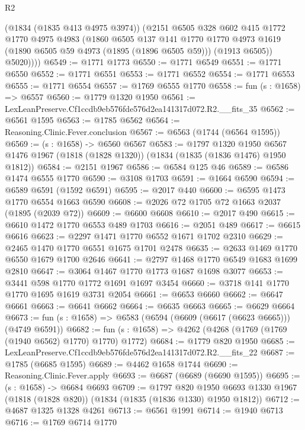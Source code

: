 \begin{lexlean}{R2}
\begin{coremodule}
          (@1834 (@1835 @413 @4975 @3974))
          (@2151
            @6505
            @328
            @602
            @415
            @1772
            @1770
            @4975
            @4983
            (@1860
              @6505
              @137
              @141
              @1770
              @1770
              @4973
              @1619
              (@1890 @6505 @59 @4973 (@1895 (@1896 @6505 @59)))
              (@1913 @6505))
            @5020))))
@6549 := @1771 @1773
@6550 := @1771 @6549
@6551 := @1771 @6550
@6552 := @1771 @6551
@6553 := @1771 @6552
@6554 := @1771 @6553
@6555 := @1771 @6554
@6557 := @1769 @6555 @1770
@6558 := fun (s : @1658) => @6557
@6560 := @1779 @1320 @1950
@6561 := LexLeanPreserve.Cf1ccdb9eb576fde576d2ea141317d072.R2.__fits_35
@6562 := @6561 @1595
@6563 := @1785 @6562
@6564 := Reasoning.Clinic.Fever.conclusion
@6567 := @6563 (@1744 (@6564 @1595))
@6569 := (s : @1658) -> @6560 @6567
@6583 := @1797
    @1320
    @1950
    @6567
    @1476
    @1967
    (@1818 (@1828 @1320))
    (@1834 (@1835 (@1836 @1476) @1950 @1812))
@6584 := @2151 @1967
@6586 := @6584 @125 @46
@6589 := @6586 @1474 @6555 @1770
@6590 := @3108 @1703
@6591 := @1664 @6590
@6594 := @6589 @6591 (@1592 @6591)
@6595 := @2017 @440
@6600 := @6595 @1473 @1770 @6554 @1663 @6590
@6608 := @2026 @72 @1705 @72 @1663 @2037 (@1895 (@2039 @72))
@6609 := @6600 @6608
@6610 := @2017 @490
@6615 := @6610 @1472 @1770 @6553 @489 @1703
@6616 := @2051 @489
@6617 := @6615 @6616
@6623 := @2297 @1471 @1770 @6552 @1671 @1702 @2310
@6629 := @2465 @1470 @1770 @6551 @1675 @1701 @2478
@6635 := @2633 @1469 @1770 @6550 @1679 @1700 @2646
@6641 := @2797 @1468 @1770 @6549 @1683 @1699 @2810
@6647 := @3064 @1467 @1770 @1773 @1687 @1698 @3077
@6653 := @3441 @598 @1770 @1772 @1691 @1697 @3454
@6660 := @3718 @141 @1770 @1770 @1695 @1619 @3731 @2054
@6661 := @6653 @6660
@6662 := @6647 @6661
@6663 := @6641 @6662
@6664 := @6635 @6663
@6665 := @6629 @6664
@6673 := fun (s : @1658) => @6583 (@6594 (@6609 (@6617 (@6623 @6665))) (@4749 @6591))
@6682 := fun (s : @1658) => @4262 (@4268 (@1769 (@1769 (@1940 @6562) @1770) @1770) @1772)
@6684 := @1779 @820 @1950
@6685 := LexLeanPreserve.Cf1ccdb9eb576fde576d2ea141317d072.R2.__fits_22
@6687 := @1785 (@6685 @1595)
@6689 := @4462 @1658 @1744
@6690 := Reasoning.Clinic.Fever.apply
@6693 := @6687 (@6689 (@6690 @1595))
@6695 := (s : @1658) -> @6684 @6693
@6709 := @1797
    @820
    @1950
    @6693
    @1330
    @1967
    (@1818 (@1828 @820))
    (@1834 (@1835 (@1836 @1330) @1950 @1812))
@6712 := @4687 @1325 @1328 @4261
@6713 := @6561 @1991
@6714 := @1940 @6713
@6716 := @1769 @6714 @1770

\end{coremodule}
\end{lexlean}
